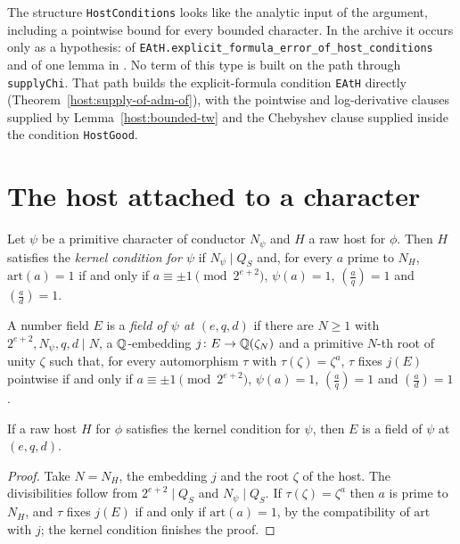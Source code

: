 \begin{remark}\label{host:rem-hostconditions}
The structure \texttt{HostConditions} looks like the analytic input of the
argument, including a pointwise bound for every bounded character. In the
archive it occurs only as a hypothesis: of
\texttt{EAtH.explicit\_formula\_error\_of\_host\_conditions} and of one
lemma in .
No term of this type is built on the path through \texttt{supplyChi}. That
path builds the explicit-formula condition \texttt{EAtH} directly
(Theorem~\ref{host:supply-of-adm-of}), with the pointwise and log-derivative
clauses supplied by Lemma~\ref{host:bounded-tw} and the Chebyshev clause
supplied inside the condition \texttt{HostGood}.
\end{remark}

\section{The host attached to a character}

\begin{definition}\label{host:kerchi}
Let $\psi$ be a primitive character of conductor $N_{\psi}$ and $H$ a raw host
for $\phi$. Then $H$ satisfies the \emph{kernel condition for $\psi$} if
$N_{\psi}\mid Q_S$ and, for every $a$ prime to $N_H$, $\mathrm{art}(a)=1$ if
and only if $a\equiv\pm1\pmod{2^{e+2}}$, $\psi(a)=1$,
$\left(\frac aq\right)=1$ and $\left(\frac ad\right)=1$.
\end{definition}

\begin{definition}\label{host:ischifield}
A number field $E$ is a \emph{field of $\psi$ at $(e,q,d)$} if there are
$N\ge1$ with $2^{e+2},N_{\psi},q,d\mid N$, a $\mathbb{Q}$-embedding
$j\colon E\to\mathbb{Q}(\zeta_N)$ and a primitive $N$-th root of unity $\zeta$ such
that, for every automorphism $\tau$ with $\tau(\zeta)=\zeta^a$, $\tau$ fixes
$j(E)$ pointwise if and only if $a\equiv\pm1\pmod{2^{e+2}}$, $\psi(a)=1$,
$\left(\frac aq\right)=1$ and $\left(\frac ad\right)=1$.
\end{definition}

\begin{lemma}\label{host:ischifield-of-kerchi}
If a raw host $H$ for $\phi$ satisfies the kernel condition for $\psi$, then
$E$ is a field of $\psi$ at $(e,q,d)$.
\end{lemma}
\begin{proof}
Take $N=N_H$, the embedding $j$ and the root $\zeta$ of the host. The
divisibilities follow from $2^{e+2}\mid Q_S$ and $N_{\psi}\mid Q_S$. If
$\tau(\zeta)=\zeta^a$ then $a$ is prime to $N_H$, and $\tau$ fixes $j(E)$
if and only if $\mathrm{art}(a)=1$, by the compatibility of $\mathrm{art}$
with $j$; the kernel condition finishes the proof.
\end{proof}

